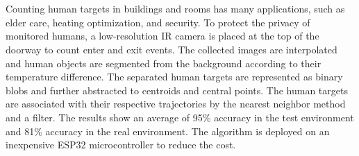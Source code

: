 \chapter{\abstractname}
Counting human targets in buildings and rooms has many applications, such as elder care, heating optimization, and security. To protect the privacy of monitored humans, a low-resolution IR camera is placed at the top of the doorway to count enter and exit events. The collected images are interpolated and human objects are segmented from the background according to their temperature difference. The separated human targets are represented as binary blobs and further abstracted to centroids and central points. The human targets are associated with their respective trajectories by the nearest neighbor method and a filter. The results show an average of 95\% accuracy in the test environment and 81\% accuracy in the real environment. The algorithm is deployed on an inexpensive ESP32 microcontroller to reduce the cost. 